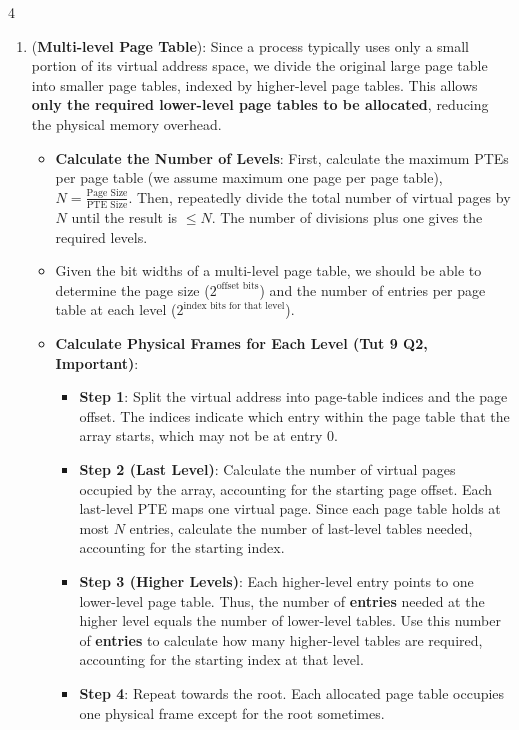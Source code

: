 \documentclass[10pt, landscape]{article}
\begin{document}
\begin{multicols}{4}
\begin{enumerate}
    \begin{itemize}
        \item Calculate using the entire virtual address space. It's not the pages needed by the process(es)!!
    \end{itemize}
    \item (\textbf{Multi-level Page Table}): Since a process typically uses only a small portion of its virtual address space, we divide the original large page table into smaller page tables, indexed by higher-level page tables. This allows \textbf{only the required lower-level page tables to be allocated}, reducing the physical memory overhead.
    \begin{itemize}
        \item \textbf{Calculate the Number of Levels}: First, calculate the maximum PTEs per page table (we assume maximum one page per page table), $N = \frac{\text{Page Size}}{\text{PTE Size}}$. Then, repeatedly divide the total number of virtual pages by $N$ until the result is $\leq N$. The number of divisions plus one gives the required levels.
        \item Given the bit widths of a multi-level page table, we should be able to determine the page size ($2^{\text{offset bits}}$) and the number of entries per page table at each level ($2^{\text{index bits for that level}}$).
        \item \textbf{Calculate Physical Frames for Each Level (Tut 9 Q2, Important)}:
        \begin{itemize}
            \item \textbf{Step 1}: Split the virtual address into page-table indices and the page offset. The indices indicate which entry within the page table that the array starts, which may not be at entry 0.
            \item \textbf{Step 2 (Last Level)}: Calculate the number of virtual pages occupied by the array, accounting for the starting page offset. Each last-level PTE maps one virtual page. Since each page table holds at most $N$ entries, calculate the number of last-level tables needed, accounting for the starting index.
            \item \textbf{Step 3 (Higher Levels)}: Each higher-level entry points to one lower-level page table. Thus, the number of \textbf{entries} needed at the higher level equals the number of lower-level tables. Use this number of \textbf{entries} to calculate how many higher-level tables are required, accounting for the starting index at that level.
            \item \textbf{Step 4}: Repeat towards the root. Each allocated page table occupies one physical frame except for the root sometimes.

\end{itemize}
\end{itemize}
\end{enumerate}
\end{multicols}
\end{document}
